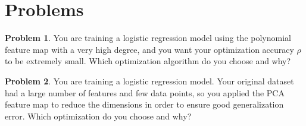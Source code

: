 \documentclass[10pt]{exam}
\theoremstyle{definition}
\newtheorem{problem}{Problem}
\newcommand{\ignore}[1]{}
\begin{document}
\ignore{
\section*{Section 2.1, 2.2}
    Reproduce the update formulas for \emph{gradient descent} (GD) and \emph{stochastic gradient descent} (SGD) below.
    This is Equations (2-5) in the reference.

\section*{Section 3.1}

Equation (6) states that the excess error $\mathcal E = E(\tilde f_n) - E(f^*)$ can be decomposed in three terms:
\begin{align*}
    \mathcal E 
    & = \bigg(E(f^*_{\mathcal F}) - E(f^*)\bigg)
      + \bigg(E(f_n) - E(f^*_{\mathcal F})\bigg)
      + \bigg(E(\tilde f_n) - E(f_n)\bigg)
\end{align*}

\section*{Section 3.2}
}

\newpage
\section*{Problems}

\begin{problem}
    You are training a logistic regression model using the polynomial feature map with a very high degree,
    and you want your optimization accuracy $\rho$ to be extremely small.
    Which optimization algorithm do you choose and why?
\end{problem}

\vspace{4in}
\begin{problem}
    You are training a logistic regression model.
    Your original dataset had a large number of features and few data points,
    so you applied the PCA feature map to reduce the dimensions in order to ensure good generalization error.
    Which optimization do you choose and why?
\end{problem}
\end{document}
